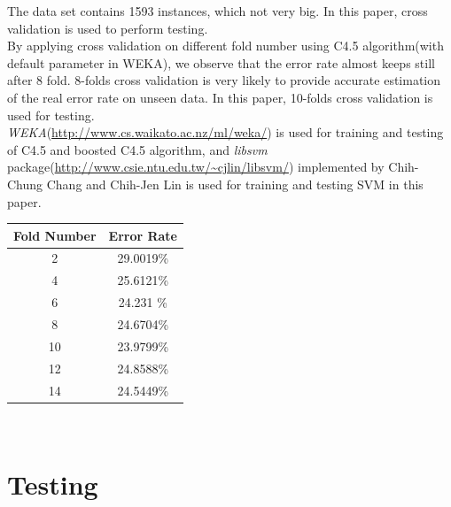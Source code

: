 \documentclass[a4paper,11pt]{article}
\begin{document}
The data set contains 1593 instances, which not very big. In this paper, cross validation is used to perform testing. \\
By applying cross validation on different fold number using C4.5 algorithm(with default parameter in WEKA), we observe that the error rate almost keeps still after 8 fold. 8-folds cross validation is very likely to provide accurate estimation of the real error rate on unseen data. In this paper, 10-folds cross validation is used for testing.\\
\emph{WEKA}(\url{http://www.cs.waikato.ac.nz/ml/weka/}) is used for training and testing of C4.5 and boosted C4.5 algorithm, and \emph{libsvm} package(\url{http://www.csie.ntu.edu.tw/~cjlin/libsvm/}) implemented by Chih-Chung Chang and Chih-Jen Lin is used for training and testing SVM in this paper.\\

\vspace{0.5cm}
\begin{tabular}{c c}
Fold Number & Error Rate\\
\hline \hline
2  &29.0019\%\\
4  &25.6121\%\\
6  &24.231 \%\\
8  & 24.6704\%\\
10 & 23.9799\%\\
12 & 24.8588\%\\
14 & 24.5449\%\\
\end{tabular}
\vspace{0.5cm}\\
\section{Testing}
\end{document}
